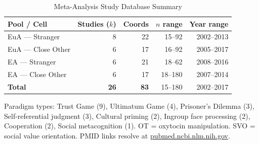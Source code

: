 \documentclass[11pt,a4paper]{report}
\begin{document}
\begin{table}[ht]
\centering\small
\caption{Meta-Analysis Study Database Summary}
\begin{tabular}{lrrrr}
\toprule
\textbf{Pool / Cell} & \textbf{Studies ($k$)} & \textbf{Coords} & \textbf{$n$ range} & \textbf{Year range} \\
\midrule
\textcolor{euaBlue}{EuA --- Stranger}    &  8 & 22 & 15--92 & 2002--2013 \\
\textcolor{euaBlue}{EuA --- Close Other} &  6 & 17 & 16--92 & 2005--2017 \\
\textcolor{eaRed}{EA --- Stranger}       &  6 & 21 & 18--62 & 2008--2016 \\
\textcolor{eaRed}{EA --- Close Other}    &  6 & 17 & 18--180 & 2007--2014 \\
\midrule
\textbf{Total} & \textbf{26} & \textbf{83} & 15--180 & 2002--2017 \\
\bottomrule
\end{tabular}
\end{table}

\noindent\small
Paradigm types: Trust Game (9), Ultimatum Game (4), Prisoner's Dilemma (3),
Self-referential judgment (3), Cultural priming (2), Ingroup face processing (2),
Cooperation (2), Social metacognition (1). OT = oxytocin manipulation.
SVO = social value orientation. PMID links resolve at
\href{https://pubmed.ncbi.nlm.nih.gov/}{pubmed.ncbi.nlm.nih.gov}.
\end{document}
